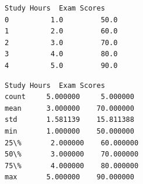 \documentclass[11pt]{article}
\makeatletter
\newcommand{\boxspacing}{\kern\kvtcb@left@rule\kern\kvtcb@boxsep}
\newcommand{\prompt}[4]{
        {\ttfamily\llap{{\color{#2}[#3]:\hspace{3pt}#4}}\vspace{-\baselineskip}}
    }
\makeatother
\begin{document}
    
    \begin{Verbatim}[commandchars=\\\{\}]
   Study Hours  Exam Scores
0          1.0         50.0
1          2.0         60.0
2          3.0         70.0
3          4.0         80.0
4          5.0         90.0
    \end{Verbatim}

    
            \begin{tcolorbox}[breakable, size=fbox, boxrule=.5pt, pad at break*=1mm, opacityfill=0]
\prompt{Out}{outcolor}{4}{\boxspacing}
\begin{Verbatim}[commandchars=\\\{\}]
       Study Hours  Exam Scores
count     5.000000     5.000000
mean      3.000000    70.000000
std       1.581139    15.811388
min       1.000000    50.000000
25\%       2.000000    60.000000
50\%       3.000000    70.000000
75\%       4.000000    80.000000
max       5.000000    90.000000
\end{Verbatim}
\end{tcolorbox}
        
\end{document}
